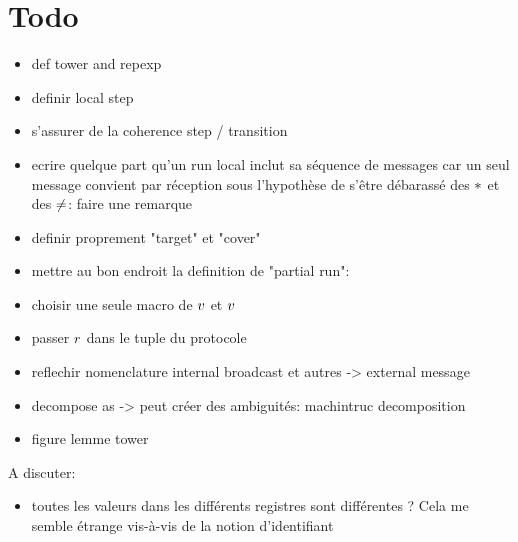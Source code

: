 \section{Todo}

\begin{itemize}
\item def tower and repexp
\item definir local step
\item s'assurer de la coherence step / transition
\item ecrire quelque part qu'un run local inclut sa séquence de messages car un seul message convient par réception sous l'hypothèse de s'être débarassé des ${*}$ et des ${\ne}$: faire une remarque \label{rem:local_transition_unique_message}
\item definir proprement "target" et "cover"
\item mettre au bon endroit la definition de "partial run": 
    \item choisir une seule macro de $v$ et $v$
    \item passer $r$ dans le tuple du protocole
    \item reflechir nomenclature internal broadcast et autres -> external message
    \item decompose as -> peut créer des ambiguités: machintruc decomposition 
    \item figure lemme tower
\end{itemize}

A discuter:
\begin{itemize}
\item toutes les valeurs dans les différents registres sont différentes ? Cela me semble étrange vis-à-vis de la notion d'identifiant


\end{itemize}